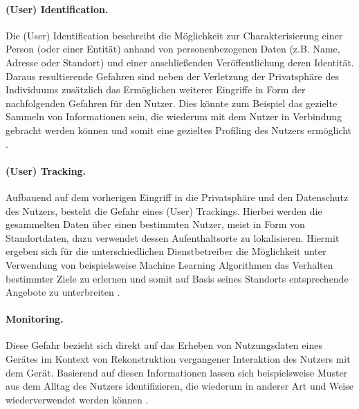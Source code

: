 \paragraph{(User) Identification.}
\label{sec:Grundlagen:para:User Identification}
Die (User) Identification beschreibt die Möglichkeit zur Charakterisierung einer Person (oder einer Entität) anhand von personenbezogenen Daten (z.B. Name, Adresse oder Standort) und einer anschließenden Veröffentlichung deren Identität. Daraus resultierende Gefahren sind neben der Verletzung der Privatsphäre des Individuums zusätzlich das Ermöglichen weiterer Eingriffe in Form der nachfolgenden Gefahren für den Nutzer. Dies könnte zum Beispiel das gezielte Sammeln von Informationen sein, die wiederum mit dem Nutzer in Verbindung gebracht werden können und somit eine gezieltes Profiling des Nutzers ermöglicht \cite{Seliem2018}.


\paragraph{(User) Tracking.}
\label{sec:Grundlagen:para:User Tracking}
Aufbauend auf dem vorherigen Eingriff in die Privatsphäre und den Datenschutz des Nutzers, besteht die Gefahr eines (User) Trackings. Hierbei werden die gesammelten Daten über einen bestimmten Nutzer, meist in Form von Standortdaten, dazu verwendet dessen Aufenthaltsorte zu lokalisieren. Hiermit ergeben sich für die unterschiedlichen Dienstbetreiber die Möglichkeit unter Verwendung von beispielsweise Machine Learning Algorithmen das Verhalten bestimmter Ziele zu erlernen und somit auf Basis seines Standorts entsprechende Angebote zu unterbreiten \cite{Seliem2018}.


\paragraph{Monitoring.}
\label{sec:Grundlagen:para:Monitoring}
Diese Gefahr bezieht sich direkt auf das Erheben von Nutzungsdaten eines Gerätes im Kontext von Rekonstruktion vergangener Interaktion des Nutzers mit dem Gerät. Basierend auf diesen Informationen lassen sich beispielsweise Muster aus dem Alltag des Nutzers identifizieren, die wiederum in anderer Art und Weise wiederverwendet werden können \cite{Seliem2018}.

